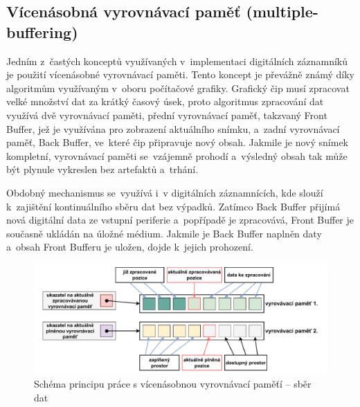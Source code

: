 \subsection{Vícenásobná vyrovnávací paměť (multiple-buffering)}
\label{vicenasobna_vyrovnavaci_pamet}
Jedním z~častých konceptů využívaných v~implementaci digitálních záznamníků je použití vícenásobné vyrovnávací paměti. Tento koncept je převážně známý díky algoritmům využívaným v~oboru počítačové grafiky. Grafický čip musí zpracovat velké množství dat za krátký časový úsek, proto algoritmus zpracování dat využívá dvě vyrovnávací paměti, přední vyrovnávací paměť, takzvaný Front Buffer, jež je využívána pro zobrazení aktuálního snímku, a~zadní vyrovnávací paměť, Back Buffer, ve~které čip připravuje nový obsah. Jakmile je nový snímek kompletní, vyrovnávací paměti se~vzájemně prohodí a~výsledný obsah tak může být plynule vykreslen bez artefaktů a~trhání.~\cite{buffering_chang, multiple_buffering_batch_saving, double_buffering_model}

Obdobný mechanismus se~využívá i~v digitálních záznamnících, kde slouží k~zajištění kontinuálního sběru dat bez výpadků. Zatímco Back Buffer přijímá nová digitální data ze vstupní periferie a~popřípadě je zpracovává, Front Buffer je současně ukládán na úložné médium. Jakmile je Back Buffer naplněn daty a~obsah Front Bufferu je uložen, dojde k~jejich prohození.~\cite{buffering_chang, multiple_buffering_batch_saving, double_buffering_model}

\begin{figure}[h]
    \centering
    \includegraphics[width=1.00\textwidth]{obrazky-figures/multiple_buffering-1.pdf}
    
    \caption{Schéma principu práce s vícenásobnou vyrovnávací paměťí -- sběr dat}
    \label{fig:multiple-buffering-1}
\end{figure}

